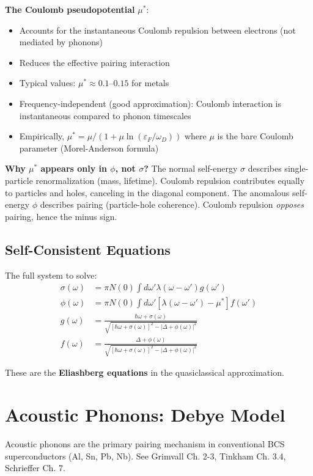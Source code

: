 \documentclass[12pt]{article}
\begin{document}
\textbf{The Coulomb pseudopotential} $\mu^*$:
\begin{itemize}
\item Accounts for the instantaneous Coulomb repulsion between electrons (not mediated by phonons)
\item Reduces the effective pairing interaction
\item Typical values: $\mu^* \approx 0.1\text{--}0.15$ for metals
\item Frequency-independent (good approximation): Coulomb interaction is instantaneous compared to phonon timescales
\item Empirically, $\mu^* = \mu/(1 + \mu \ln(\varepsilon_F/\omega_D))$ where $\mu$ is the bare Coulomb parameter (Morel-Anderson formula)
\end{itemize}

\textbf{Why $\mu^*$ appears only in $\phi$, not $\sigma$?} The normal self-energy $\sigma$ describes single-particle renormalization (mass, lifetime). Coulomb repulsion contributes equally to particles and holes, canceling in the diagonal component. The anomalous self-energy $\phi$ describes pairing (particle-hole coherence). Coulomb repulsion \textit{opposes} pairing, hence the minus sign.

\subsection{Self-Consistent Equations}

The full system to solve:
\begin{align}
\sigma(\omega) &= \pi N(0) \int d\omega' \lambda(\omega - \omega') g(\omega') \\
\phi(\omega) &= \pi N(0) \int d\omega' [\lambda(\omega - \omega') - \mu^*] f(\omega') \\
g(\omega) &= \frac{\hbar\omega + \sigma(\omega)}{\sqrt{[\hbar\omega + \sigma(\omega)]^2 - |\Delta + \phi(\omega)|^2}} \\
f(\omega) &= \frac{\Delta + \phi(\omega)}{\sqrt{[\hbar\omega + \sigma(\omega)]^2 - |\Delta + \phi(\omega)|^2}}
\end{align}

These are the \textbf{Eliashberg equations} in the quasiclassical approximation.

\section{Acoustic Phonons: Debye Model}

Acoustic phonons are the primary pairing mechanism in conventional BCS superconductors (Al, Sn, Pb, Nb). See Grimvall Ch. 2-3, Tinkham Ch. 3.4, Schrieffer Ch. 7.
\end{document}

